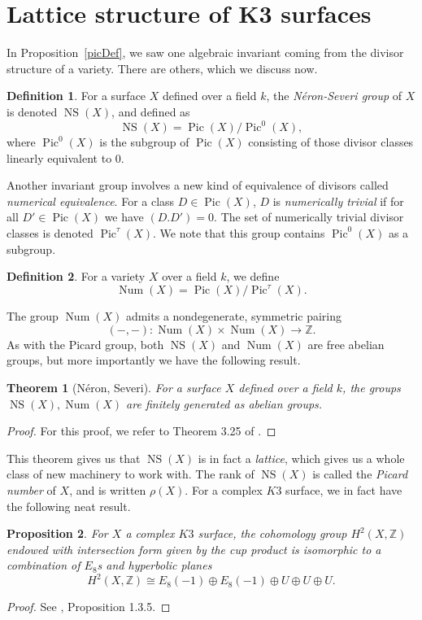 \documentclass[12pt,twoside]{reedthesis}
\theoremstyle{plain}
\newtheorem{theorem}{Theorem}[chapter]
\newtheorem{proposition}[theorem]{Proposition}
\theoremstyle{definition}
\newtheorem{definition}{Definition}[section]
\theoremstyle{remark}
\newcommand{\ZZ}{\mathbb{Z}}
\newcommand{\Pic}{\operatorname{Pic}}
\newcommand{\NS}{\operatorname{NS}}
\newcommand{\Num}{\operatorname{Num}}
\begin{document}
\section{Lattice structure of K3 surfaces}
In Proposition~\ref{picDef}, we saw one algebraic invariant coming from the divisor structure of a variety. There are others, which we discuss now.
\begin{definition}
For a surface $X$ defined over a field $k$, the \emph{N\'eron-Severi group} of $X$ is denoted $\NS(X)$, and defined as \[\NS(X)=\Pic(X)/\Pic^0(X),\] where $\Pic^0(X)$ is the subgroup of $\Pic(X)$ consisting of those divisor classes linearly equivalent to 0.
\end{definition}
\noindent Another invariant group involves a new kind of equivalence of divisors called \emph{numerical equivalence}. For a class $D\in\Pic(X)$, $D$ is \emph{numerically trivial} if for all $D'\in\Pic(X)$ we have $(D.D')=0$. The set of numerically trivial divisor classes is denoted $\Pic^\tau(X)$. We note that this group contains $\Pic^0(X)$ as a subgroup.
\begin{definition}
For a variety $X$ over a field $k$, we define \[\Num(X)=\Pic(X)/\Pic^\tau(X).\]
\end{definition}
\noindent The group $\Num(X)$ admits a nondegenerate, symmetric pairing
\[
(-,-):\Num(X)\times\Num(X)\to\ZZ.
\]
As with the Picard group, both $\NS(X)$ and $\Num(X)$ are free abelian groups, but more importantly we have the following result.
\begin{theorem}[N\'eron, Severi] For a surface $X$ defined over a field $k$, the groups $\NS(X),\Num(X)$ are finitely generated as abelian groups.
\end{theorem}
\begin{proof}
For this proof, we refer to Theorem 3.25 of \cite{milneET}.
\end{proof}
\noindent This theorem gives us that $\NS(X)$ is in fact a \emph{lattice}, which gives us a whole class of new machinery to work with. The rank of $\NS(X)$ is called the \emph{Picard number} of $X$, and is written $\rho(X)$.
For a complex $K3$ surface, we in fact have the following neat result.
\begin{proposition}
For $X$ a complex $K3$ surface, the cohomology group $H^2(X,\ZZ)$ endowed with intersection form given by the cup product is isomorphic to a combination of $E_8$s and hyperbolic planes
\[
H^2(X,\ZZ)\cong E_8(-1)\oplus E_8(-1)\oplus U\oplus U\oplus U.
\]
\end{proposition}
\begin{proof}
See \cite{huybrechts}, Proposition 1.3.5.
\end{proof}
\end{document}
